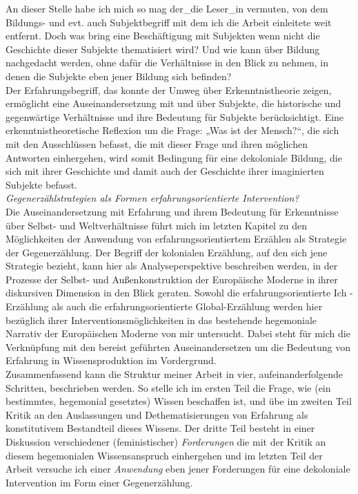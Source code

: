An dieser Stelle habe ich mich so mag der\_die Leser\_in vermuten, von dem
Bildungs- und evt. auch Subjektbegriff mit dem ich die Arbeit einleitete weit
entfernt. Doch was bring eine Beschäftigung mit Subjekten wenn nicht die
Geschichte dieser Subjekte thematisiert wird? Und wie kann über Bildung
nachgedacht werden, ohne dafür die Verhältnisse in den Blick zu nehmen, in
denen die Subjekte eben jener Bildung sich befinden?\\
Der Erfahrungsbegriff, das konnte der Umweg über Erkenntnistheorie zeigen,
ermöglicht eine Auseinandersetzung mit und über Subjekte, die historische und
gegenwärtige Verhältnisse und ihre Bedeutung für Subjekte berücksichtigt. Eine
erkenntnistheoretische Reflexion um die Frage: „Was ist der Mensch?“, die sich
mit den Ausschlüssen befasst, die mit dieser Frage und ihren möglichen
Antworten einhergehen, wird somit Bedingung für eine dekoloniale Bildung, die
sich mit ihrer Geschichte und damit auch der Geschichte ihrer imaginierten
Subjekte befasst.\\[0.75em]
\textit{Gegenerzählstrategien als Formen erfahrungsorientierte Intervention?}\\
Die Auseinandersetzung mit Erfahrung und ihrem Bedeutung für Erkenntnisse über
Selbst- und Weltverhältnisse führt mich im letzten Kapitel zu den Möglichkeiten
der Anwendung von erfahrungsorientiertem Erzählen als Strategie der
Gegenerzählung. Der Begriff der kolonialen Erzählung, auf den sich jene
Strategie bezieht, kann hier als Analyseperspektive beschreiben werden, in der
Prozesse der Selbst- und Außenkonstruktion der Europäische Moderne in ihrer
diskursiven Dimension in den Blick geraten. Sowohl die erfahrungsorientierte
Ich - Erzählung als auch die erfahrungsorientierte Global-Erzählung werden hier
bezüglich ihrer Interventionsmöglichkeiten in das bestehende hegemoniale
Narrativ der Europäischen Moderne von mir untersucht. Dabei steht für mich die
Verknüpfung mit den bereist geführten Auseinandersetzen um die Bedeutung von
Erfahrung in Wissensproduktion im Vordergrund.\\

Zusammenfassend kann die Struktur meiner Arbeit in vier, aufeinanderfolgende
Schritten, beschrieben werden. So stelle ich im ersten Teil die Frage, wie (ein
bestimmtes, hegemonial gesetztes) Wissen beschaffen ist, und übe im zweiten
Teil Kritik an den Auslassungen und Dethematisierungen von Erfahrung als
konstitutivem Bestandteil dieses Wissens. Der dritte Teil besteht in einer Diskussion verschiedener (feministischer)
\textit{Forderungen} die mit der Kritik an diesem hegemonialen Wissensanspruch
einhergehen und im letzten Teil der Arbeit versuche ich einer
\textit{Anwendung} eben
jener Forderungen für eine dekoloniale Intervention im Form einer
Gegenerzählung.

